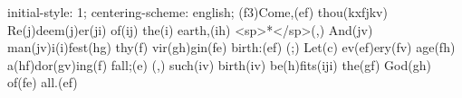 initial-style: 1;
centering-scheme: english;
(f3)Come,(ef) thou(kxfjkv) Re(j)deem(j)er(ji) of(ij) the(i) earth,(ih) <sp>*</sp>(,)
And(jv) man(jv)i(i)fest(hg) thy(f) vir(gh)gin(fe) birth:(ef) (;)
Let(c) ev(ef)ery(fv) age(fh) a(hf)dor(gv)ing(f) fall;(e) (,)
such(iv) birth(iv) be(h)fits(iji) the(gf) God(gh) of(fe) all.(ef)
